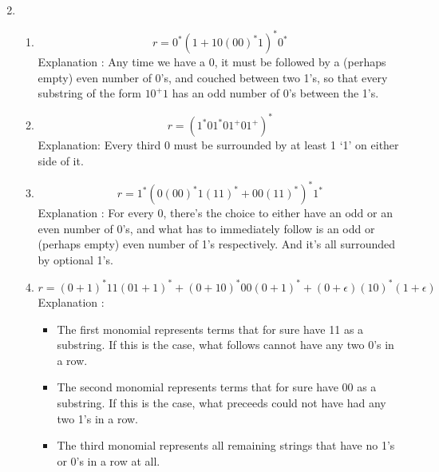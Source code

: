 
\usepackage{amsmath}

\oddsidemargin 0in
\evensidemargin 0in
\textwidth 6.5in
\topmargin -0.5in
\textheight 9.0in
\newcommand{\norm}[1]{\left\lVert #1 \right\rVert}


\pagestyle{myheadings}

\begin{enumerate}
  \setcounter{enumi}{1}
\item
  \begin{enumerate}
    \item
      $$r = 0^*(1 + 10(00)^*1)^*0^*$$
      Explanation : Any time we have a 0, it must be followed by a (perhaps empty) even number of 0's, and couched between two 1's, so that every substring of the form $10^+1$ has an odd number of 0's between the 1's.
    \item
      $$r = (1^*01^*01^+01^+)^*$$ 
      Explanation: Every third 0 must be surrounded by at least 1 `1' on either side of it.
    \item
      $$r = 1^*(0(00)^*1(11)^* + 00(11)^*)^* 1^*$$
      Explanation : For every 0, there's the choice to either have an odd or an even number of 0's, and what has to immediately follow is an odd or (perhaps empty) even number of 1's respectively. And it's all surrounded by optional 1's.

    \item
      $$r = (0+1)^*11(01 + 1)^* + (0+10)^*00(0+1)^* + (0+\epsilon)(10)^*(1+\epsilon)$$
      Explanation : 
      \begin{itemize}
        \item The first monomial represents terms that for sure have 11 as a substring. If this is the case, what follows cannot have any two 0's in a row.
        \item The second monomial represents terms that for sure have 00 as a substring. If this is the case, what preceeds could not have had any two 1's in a row.
        \item The third monomial represents all remaining strings that have no 1's or 0's in a row at all.            
      \end{itemize}
  \end{enumerate}

\end{enumerate}
